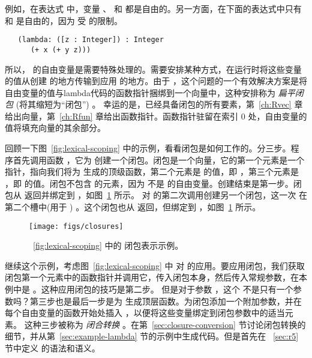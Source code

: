 \documentclass[11pt]{book}
\begin{document}
例如，在表达式  中，变量
 、  和  都是自由的。另一方面，在下面的表达式中只有  和  是自由的，因为  受  的限制。
\begin{lstlisting}
   (lambda: ([z : Integer]) : Integer
      (+ x (+ y z)))
\end{lstlisting}

所以，  的自由变量是需要特殊处理的。需要安排某种方式，在运行时将这些变量的值从创建
 的地方传输到应用  的地方。由于
\citet{Cardelli:1983aa} ，这个问题的一个有效解决方案是将自由变量的值与lambda代码的函数指针捆绑到一个向量中，这种安排称为 \emph{扁平闭包} (将其缩短为“闭包”) 。 幸运的是，已经具备闭包的所有要素，第~\ref{ch:Rvec}
章给出向量，第~\ref{ch:Rfun} 章给出函数指针。函数指针驻留在索引 $0$ 处，自由变量的值将填充向量的其余部分。

回顾一下图~\ref{fig:lexical-scoping} 中的示例，看看闭包是如何工作的。分三步。程序首先调用函数  ，它为  创建一个闭包。闭包是一个向量，它的第一个元素是一个指针，指向我们将为  生成的顶级函数，第二个元素是  的值，即 ，第三个元素是  ，即  的值。闭包不包含  的元素，因为  不是  的自由变量。创建结束是第一步。闭包从  返回并绑定到  ，如图~\ref{fig:closures} 所示。
%
对  的第二次调用创建另一个闭包，这一次
 在第二个槽中(用于 ) 。这个闭包也从  返回，但绑定到  ，如图~\ref{fig:closures} 所示。

\begin{figure}[tbp]
\centering \texttt{[image: figs/closures]}
\caption{~\ref{fig:lexical-scoping} 中的  闭包表示示例。}
\label{fig:closures}
\end{figure}

继续这个示例，考虑图~\ref{fig:lexical-scoping} 中  对
 的应用。要应用闭包，我们获取闭包第一个元素中的函数指针并调用它，传入闭包本身，然后传入常规参数，在本例中是  。这种应用闭包的技巧是第二步。
%
但是对于参数  ，这个  不是只有一个参数吗？第三步也是最后一步是为  生成顶层函数。为闭包添加一个附加参数，并在每个自由变量的函数开始处插入  ，以便将这些变量绑定到闭包参数中的适当元素。
%
这种三步被称为 \emph{闭合转换} 。在第~\ref{sec:closure-conversion} 节讨论闭包转换的细节，并从第~\ref{sec:example-lambda} 节的示例中生成代码。但是首先在 ~\ref{sec:r5} 节中定义 \LangLam{} 的语法和语义。
\end{document}

